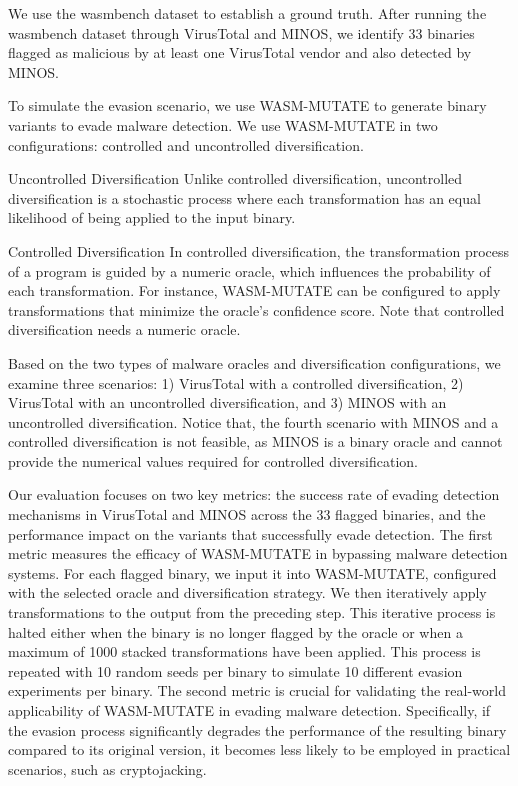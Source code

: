 We use the wasmbench dataset \cite{Hilbig2021AnES} to establish a ground truth. 
After running the wasmbench dataset through VirusTotal and MINOS, we identify 33 binaries flagged as malicious by at least one VirusTotal vendor and also detected by MINOS.

To simulate the evasion scenario, we use WASM-MUTATE to generate \Wasm binary variants to evade malware detection.
We use WASM-MUTATE in two configurations: controlled and uncontrolled diversification.

\begin{definition}{Uncontrolled Diversification}
    \label{uncontrolled_def}
    Unlike controlled diversification, uncontrolled diversification is a stochastic process where each transformation has an equal likelihood of being applied to the input \Wasm binary.
\end{definition}

\begin{definition}{Controlled Diversification}
    \label{controlled_def}
    In controlled diversification, the transformation process of a \Wasm program is guided by a numeric oracle, which influences the probability of each transformation. For instance, WASM-MUTATE can be configured to apply transformations that minimize the oracle's confidence score. Note that controlled diversification needs a numeric oracle.
\end{definition}


Based on the two types of malware oracles and diversification configurations, we examine three scenarios:
1) VirusTotal with a controlled diversification, 2) VirusTotal with an uncontrolled diversification, and 3) MINOS with an uncontrolled diversification.
Notice that, the fourth scenario with MINOS and a controlled diversification is not feasible, as MINOS is a binary oracle and cannot provide the numerical values required for controlled diversification.

Our evaluation focuses on two key metrics: the success rate of evading detection mechanisms in VirusTotal and MINOS across the 33 flagged binaries, and the performance impact on the variants that successfully evade detection.
The first metric measures the efficacy of WASM-MUTATE in bypassing malware detection systems. 
For each flagged binary, we input it into WASM-MUTATE, configured with the selected oracle and diversification strategy. 
We then iteratively apply transformations to the output from the preceding step. 
This iterative process is halted either when the binary is no longer flagged by the oracle or when a maximum of 1000 stacked transformations have been applied.
This process is repeated with 10 random seeds per binary to simulate 10 different evasion experiments per binary.
The second metric is crucial for validating the real-world applicability of WASM-MUTATE in evading malware detection. 
Specifically, if the evasion process significantly degrades the performance of the resulting binary compared to its original version, it becomes less likely to be employed in practical scenarios, such as cryptojacking.

